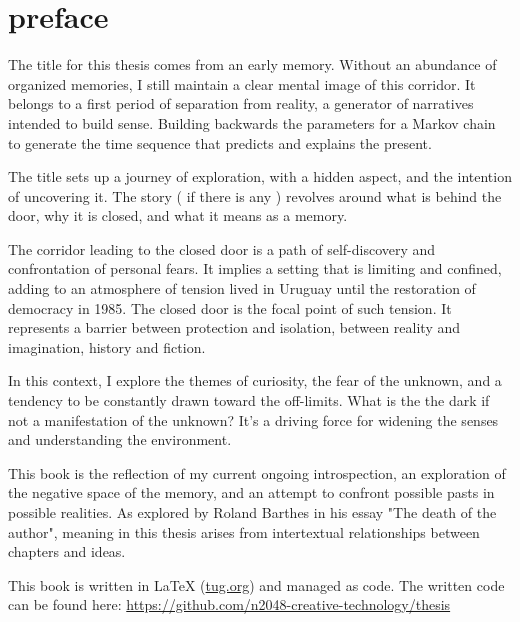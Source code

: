 \chapter*{preface}
\normalsize

The title for this thesis comes from an early memory. Without an abundance of organized memories, I still maintain a clear mental image of this corridor. It belongs to a first period of separation from reality, a generator of narratives intended to build sense. Building backwards the parameters for a Markov chain to generate the time sequence that predicts and explains the present.    

The title sets up a journey of exploration, with a hidden aspect, and the intention of uncovering it. The story ( if there is any ) {r}evolves around what is behind the door, why it is closed, and what it means as a memory.

The corridor leading to the closed door is a path of self-discovery and confrontation of personal fears. It implies a setting that is limiting and confined, adding to an atmosphere of tension lived in Uruguay until the restoration of democracy in 1985. The closed door is the focal point of such tension. It represents a barrier between protection and isolation, between reality and imagination, history and fiction.

In this context, I explore the themes of curiosity, the fear of the unknown, and a tendency to be constantly drawn toward the off-limits. What is the the dark if not a manifestation of the unknown? It's a driving force for widening the senses and understanding the environment.

This book is the reflection of my current ongoing introspection, an exploration of the negative space of the memory, and an attempt to confront possible pasts in possible realities. As explored by Roland Barthes in his essay "The death of the author"\citep{barthes1967}, meaning in this thesis arises from intertextual relationships between chapters and ideas. 

This book is written in \LaTeX{} (\href{https://www.tug.org/texlive/quickinstall.html}{tug.org}) and managed as code. The written code can be found here: \href{https://github.com/n2048-creative-technology/thesis}{https://github.com/n2048-creative-technology/thesis} 

 